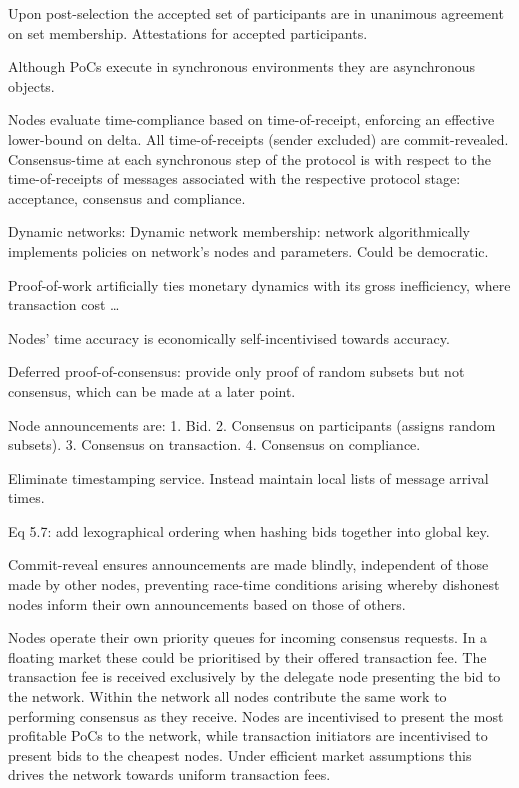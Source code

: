 Upon post-selection the accepted set of participants are in unanimous agreement on set membership.
Attestations for accepted participants.

Although PoCs execute in synchronous environments they are asynchronous objects.

Nodes evaluate time-compliance based on time-of-receipt, enforcing an effective lower-bound on delta. All time-of-receipts (sender excluded) are commit-revealed. Consensus-time at each synchronous step of the protocol is with respect to the time-of-receipts of messages associated with the respective protocol stage: acceptance, consensus and compliance.

Dynamic networks: Dynamic network membership: network algorithmically implements policies on network’s nodes and parameters. Could be democratic.

Proof-of-work artificially ties monetary dynamics with its gross inefficiency, where transaction cost …

Nodes' time accuracy is economically self-incentivised towards accuracy.

Deferred proof-of-consensus: provide only proof of random subsets but not consensus, which can be made at a later point.

Node announcements are:
1. Bid.
2. Consensus on participants (assigns random subsets).
3. Consensus on transaction.
4. Consensus on compliance.

Eliminate timestamping service. Instead maintain local lists of message arrival times.

Eq 5.7: add lexographical ordering when hashing bids together into global key.

Commit-reveal ensures announcements are made blindly, independent of those made by other nodes, preventing race-time conditions arising whereby dishonest nodes inform their own announcements based on those of others.

Nodes operate their own priority queues for incoming consensus requests. In a floating market these could be prioritised by their offered transaction fee. The transaction fee is received exclusively by the delegate node presenting the bid to the network. Within the network all nodes contribute the same work to performing consensus as they receive. Nodes are incentivised to present the most profitable PoCs to the network, while transaction initiators are incentivised to present bids to the cheapest nodes. Under efficient market assumptions this drives the network towards uniform transaction fees.

